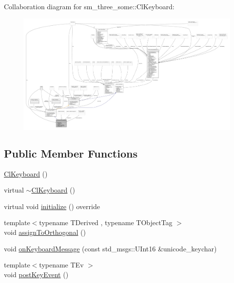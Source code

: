 Collaboration diagram for sm\+\_\+three\+\_\+some\+:\+:Cl\+Keyboard\+:
\nopagebreak
\begin{figure}[H]
\begin{center}
\leavevmode
\includegraphics[width=350pt]{classsm__three__some_1_1ClKeyboard__coll__graph}
\end{center}
\end{figure}
\subsection*{Public Member Functions}
\begin{DoxyCompactItemize}
\item 
\hyperlink{classsm__three__some_1_1ClKeyboard_adf56f7d1cba8294c12cc711c1916496d}{Cl\+Keyboard} ()
\item 
virtual \hyperlink{classsm__three__some_1_1ClKeyboard_a08df3fe2752b6eee73899e511d7d888a}{$\sim$\+Cl\+Keyboard} ()
\item 
virtual void \hyperlink{classsm__three__some_1_1ClKeyboard_adbc06c9dc3a4a5b266ff70a4300dcdeb}{initialize} () override
\item 
{\footnotesize template$<$typename T\+Derived , typename T\+Object\+Tag $>$ }\\void \hyperlink{classsm__three__some_1_1ClKeyboard_a5b7cc7009e68ab8f102da405977db255}{assign\+To\+Orthogonal} ()
\item 
void \hyperlink{classsm__three__some_1_1ClKeyboard_ad6f5619d4c4875a6d0dc8262ab49e10f}{on\+Keyboard\+Message} (const std\+\_\+msgs\+::\+U\+Int16 \&unicode\+\_\+keychar)
\item 
{\footnotesize template$<$typename T\+Ev $>$ }\\void \hyperlink{classsm__three__some_1_1ClKeyboard_a7e632c803df38eba991432752bcf7116}{post\+Key\+Event} ()
\end{DoxyCompactItemize}
